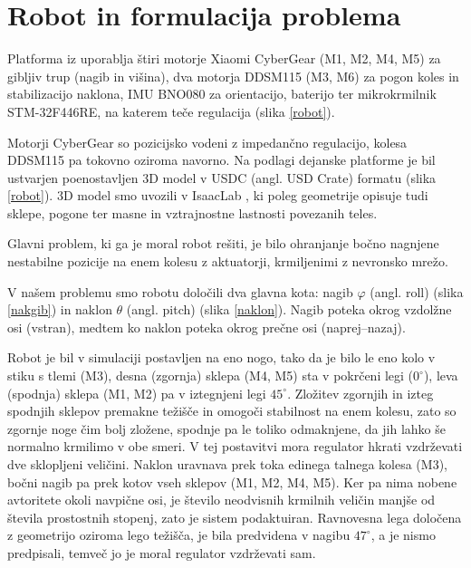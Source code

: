 \section{Robot in formulacija problema}
Platforma iz \cite{Tofant2025Dife} uporablja štiri motorje Xiaomi CyberGear (M1, M2, M4, M5) za gibljiv trup (nagib in višina), dva motorja DDSM115 (M3, M6) za pogon koles in stabilizacijo naklona, IMU BNO080 za orientacijo, baterijo ter mikrokrmilnik STM-32F446RE, na katerem teče regulacija (slika \ref{robot}).
  
  Motorji CyberGear so pozicijsko vodeni z impedančno regulacijo, kolesa DDSM115 pa tokovno oziroma navorno. Na podlagi dejanske platforme je bil ustvarjen poenostavljen 3D model v USDC (angl. USD Crate) formatu (slika \ref{robot}). 3D model smo uvozili v IsaacLab \cite{Mittal2025Isaa}, ki poleg geometrije opisuje tudi sklepe, pogone ter masne in vztrajnostne lastnosti povezanih teles. 
  
Glavni problem, ki ga je moral robot rešiti, je bilo ohranjanje bočno nagnjene nestabilne pozicije na enem kolesu z aktuatorji, krmiljenimi z nevronsko mrežo.
  
  V našem problemu smo robotu določili dva glavna kota: nagib $\varphi$ (angl. roll) (slika \ref{nakgib}) in naklon $\theta$ (angl. pitch) (slika \ref{naklon}). Nagib poteka okrog vzdolžne osi (vstran), medtem ko naklon poteka okrog prečne osi (naprej–nazaj).
 
Robot je bil v simulaciji postavljen na eno nogo, tako da je bilo le eno kolo v stiku s tlemi (M3), desna (zgornja) sklepa (M4, M5) sta v pokrčeni legi ($ 0^\circ $), leva (spodnja) sklepa (M1, M2) pa v iztegnjeni legi $ 45^\circ $. Zložitev zgornjih in izteg spodnjih sklepov premakne težišče in omogoči stabilnost na enem kolesu, zato so zgornje noge čim bolj zložene, spodnje pa le toliko odmaknjene, da jih lahko še normalno krmilimo v obe smeri. V tej postavitvi mora regulator hkrati vzdrževati dve sklopljeni veličini. Naklon uravnava prek toka edinega talnega kolesa (M3), bočni nagib pa prek kotov vseh sklepov (M1, M2, M4, M5). Ker pa nima nobene avtoritete okoli navpične osi, je  število neodvisnih krmilnih veličin manjše od števila prostostnih stopenj, zato je sistem pod\-aktuiran. Ravnovesna lega določena z geometrijo oziroma lego težišča, je bila predvidena v nagibu $ 47^\circ $, a je nismo predpisali, temveč jo je moral regulator vzdrževati sam. 
  
